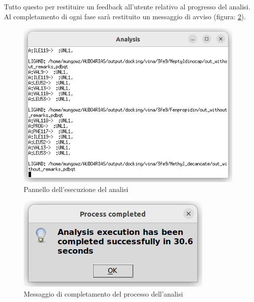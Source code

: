 Tutto questo per restituire un feedback all'utente relativo al progresso del analisi. Al completamento di ogni fase sarà restituito un messaggio di avviso (figura: \ref{fig:progress completed analysis}).

\begin{figure}[H]
    \centering
    \includegraphics[scale=0.8]{immagini/capitolo3/analysisExecution.png}
    \caption{Pannello dell'esecuzione del analisi}
    \label{fig:analysis execution}
\end{figure}

\begin{figure}[H]
    \centering
    \includegraphics{immagini/capitolo3/progressCompletedAnalysis.png}
    \caption{Messaggio di completamento del processo dell'analisi}
    \label{fig:progress completed analysis}
\end{figure}